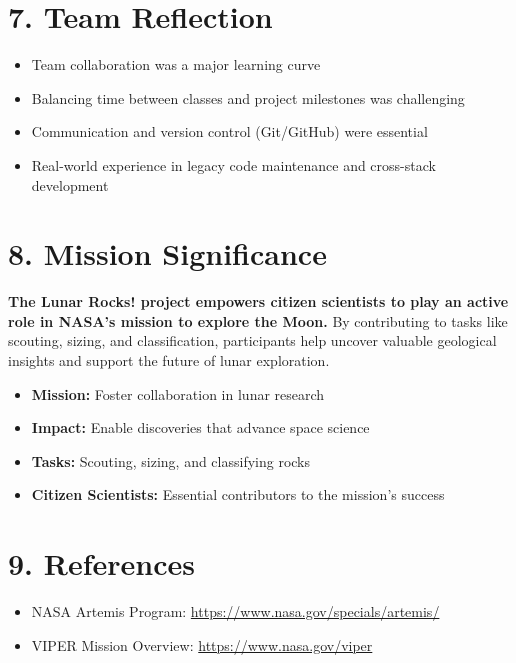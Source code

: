 \documentclass[12pt]{article}
\begin{document}
\section*{7. Team Reflection}
\begin{itemize}
  \item Team collaboration was a major learning curve
  \item Balancing time between classes and project milestones was challenging
  \item Communication and version control (Git/GitHub) were essential
  \item Real-world experience in legacy code maintenance and cross-stack development
\end{itemize}

\section*{8. Mission Significance}
\textbf{The Lunar Rocks! project empowers citizen scientists to play an active role in NASA’s mission to explore the Moon.} By contributing to tasks like scouting, sizing, and classification, participants help uncover valuable geological insights and support the future of lunar exploration.
\begin{itemize}
  \item \textbf{Mission:} Foster collaboration in lunar research
  \item \textbf{Impact:} Enable discoveries that advance space science
  \item \textbf{Tasks:} Scouting, sizing, and classifying rocks
  \item \textbf{Citizen Scientists:} Essential contributors to the mission’s success
\end{itemize}

\section*{9. References}
\begin{itemize}
  \item NASA Artemis Program: \url{https://www.nasa.gov/specials/artemis/}
  \item VIPER Mission Overview: \url{https://www.nasa.gov/viper}
\end{itemize}
\end{document}
